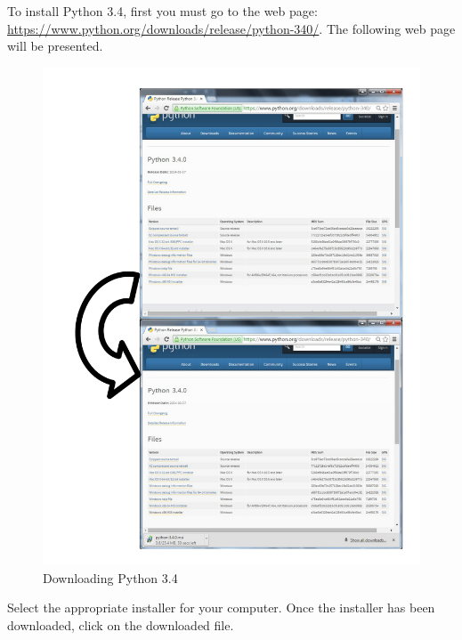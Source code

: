 To install Python 3.4, first you must go to the web page: \url{https://www.python.org/downloads/release/python-340/}. The following web page will be presented.

\begin{figure}[H]
    \includegraphics[width=\textwidth]{./Manual/Images/DownloadingPython.pdf}
    \caption{Downloading Python 3.4} \label{fig:DownloadingPython}
\end{figure}

Select the appropriate installer for your computer. Once the installer has been downloaded, click on the downloaded file.

